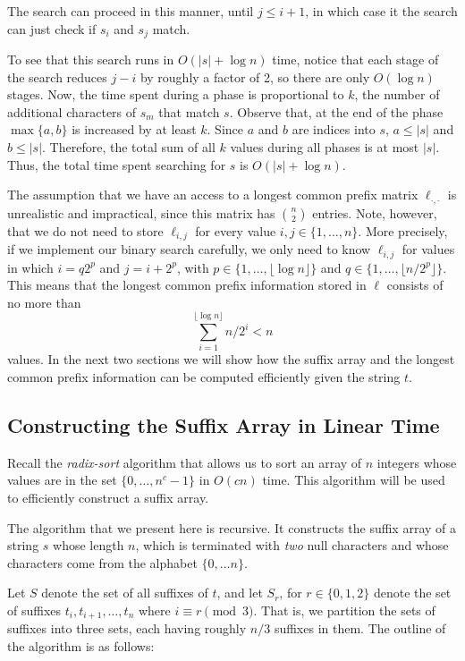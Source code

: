 The search can proceed in this manner, until $j \le i+1$, in which case it the search can just check if $s_i$ and $s_j$ match.

To see that this search runs in $O(|s|+\log n)$ time, notice that each stage of the search reduces $j-i$ by roughly a factor of 2, so there are only $O(\log n)$ stages.  Now, the time spent during a phase is proportional to $k$, the number of additional characters of $s_m$ that match $s$.  Observe that, at the end of the phase $\max\{a,b\}$ is increased by at least $k$.  Since $a$ and $b$ are indices into $s$, $a\le|s|$ and $b\le|s|$. Therefore, the total sum of all $k$ values during all phases is at most $|s|$.  Thus, the total time spent searching for $s$ is $O(|s|+\log n)$.

The assumption that we have an access to a longest common prefix matrix $\ell_{\cdot,\cdot}$ is unrealistic and impractical, since this matrix has $\binom{n}{2}$ entries.  Note, however, that we do not need to store $\ell_{i,j}$ for every value $i,j\in\{1,\ldots,n\}$.  More precisely, if we implement our binary search carefully, we only need to know $\ell_{i,j}$ for values in which $i=q2^p$ and $j=i+2^{p}$, with $p\in\{1,\ldots,\lfloor \log n\rfloor\}$ and $q\in\{1,\ldots,\lfloor n/2^p\rfloor\}$. This means that the longest common prefix information stored in $\ell$ consists of no more than
\[
  \sum_{i=1}^{\lfloor\log n\rfloor} n/2^i < n
\]
values.  In the next two sections we will show how the suffix array and the longest common prefix information can be computed efficiently given the string $t$.

\subsection{Constructing the Suffix Array in Linear Time}

Recall the \emph{radix-sort} algorithm that allows us to sort an array of $n$ integers whose values are in the set $\{0,\ldots,n^c-1\}$ in $O(cn)$ time.  This algorithm will be used to efficiently construct a suffix array.

The algorithm that we present here is recursive.  It constructs the suffix array of a string $s$ whose length $n$, which is terminated with \emph{two} null characters and whose characters come from the alphabet $\{0,\ldots n\}$.

Let $S$ denote the set of all suffixes of $t$, and let $S_r$, for $r\in\{0,1,2\}$ denote the set of suffixes $t_i,t_{i+1},\ldots,t_n$ where $i\equiv r\pmod 3$.  That is, we partition the sets of suffixes into three sets, each having roughly $n/3$ suffixes in them.  The outline of the algorithm is as follows:


